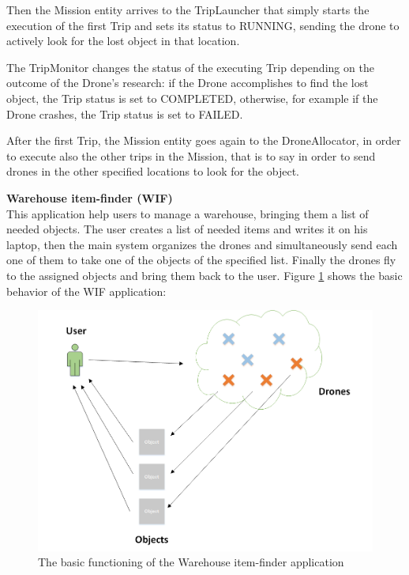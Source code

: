 Then the Mission entity arrives to the TripLauncher that simply starts the execution of the first Trip and sets its status to RUNNING, sending the drone to actively look for the lost object in that location.

The TripMonitor changes the status of the executing Trip depending on the outcome of the Drone's research:
if the Drone accomplishes to find the lost object, the Trip status is set to COMPLETED, otherwise, for example if the Drone crashes, the Trip status is set to FAILED.

After the first Trip, the Mission entity goes again to the DroneAllocator, in order to execute also the other trips in the Mission, that is to say in order to send drones in the other specified locations to look for the object.


\newpage

\textbf{Warehouse item-finder (WIF)}
\\

This application help users to manage a warehouse, bringing them a list of needed objects.
The user creates a list of needed items and writes it on his laptop, then
the main system organizes the drones and simultaneously send each one of them to take one of the objects of the specified list.
Finally the drones fly to the assigned objects and bring them back to the user.
Figure \ref{fig:WIS} shows the basic behavior of the WIF application:

\begin{figure}[H]
  \centering
  \includegraphics[width=\linewidth]{pictures/WIF.png}
  \caption{The basic functioning of the Warehouse item-finder application}
  \label{fig:WIS}
\end{figure}

